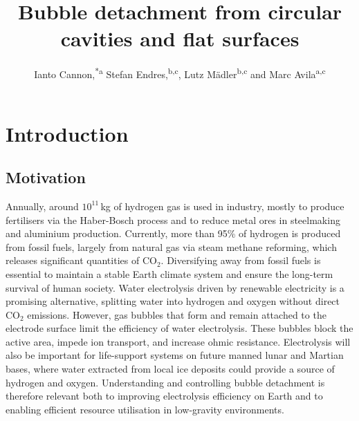 \documentclass[9pt]{extarticle}
\title{Bubble detachment from circular cavities and flat surfaces}
\author{Ianto Cannon,\orcid{0000-0002-1676-9338}\textsuperscript{*a}  Stefan Endres,\orcid{0000-0002-9501-2762}\textsuperscript{b,c}, Lutz M\"adler\orcid{0000-0002-7073-0733}\textsuperscript{b,c} and Marc Avila\orcid{0000-0001-5988-1090}\textsuperscript{a,c}}
\begin{document}
\maketitle


\section{Introduction}
\subsection{Motivation}

Annually, around $10^{11}$\,kg of hydrogen gas is used in industry, mostly to produce fertilisers via the Haber-Bosch process\cite{bosch32development} and to reduce metal ores in steelmaking and aluminium production\cite{kullmann23role}. Currently, more than 95\% of hydrogen is produced from fossil fuels, largely from natural gas via steam methane reforming\cite{franchi20hydrogen}, which releases significant quantities of CO$_2$. Diversifying away from fossil fuels is essential to maintain a stable Earth climate system and ensure the long-term survival of human society\cite{steffen18trajectories}. Water electrolysis driven by renewable electricity is a promising alternative\cite{kullmann23role}, splitting water into hydrogen and oxygen without direct CO$_2$ emissions. However, gas bubbles that form and remain attached to the electrode surface limit the efficiency of water electrolysis. These bubbles block the active area, impede ion transport, and increase ohmic resistance\cite{vogt89problem,penas19decoupling,angulo20influence,ross25impact,ross26transient}. Electrolysis will also be important for life-support systems on future manned lunar and Martian bases, where water extracted from local ice deposits could provide a source of hydrogen and oxygen\cite{matsushima06water}. Understanding and controlling bubble detachment is therefore relevant both to improving electrolysis efficiency on Earth and to enabling efficient resource utilisation in low-gravity environments\cite{brinkert22fundamentals}.
\end{document}
